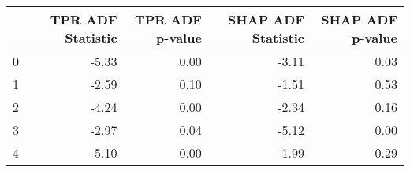\begin{tabular}{lrrrr}
\toprule
 & TPR ADF Statistic & TPR ADF p-value & SHAP ADF Statistic & SHAP ADF p-value \\
\midrule
0 & -5.33 & 0.00 & -3.11 & 0.03 \\
1 & -2.59 & 0.10 & -1.51 & 0.53 \\
2 & -4.24 & 0.00 & -2.34 & 0.16 \\
3 & -2.97 & 0.04 & -5.12 & 0.00 \\
4 & -5.10 & 0.00 & -1.99 & 0.29 \\
\bottomrule
\end{tabular}
